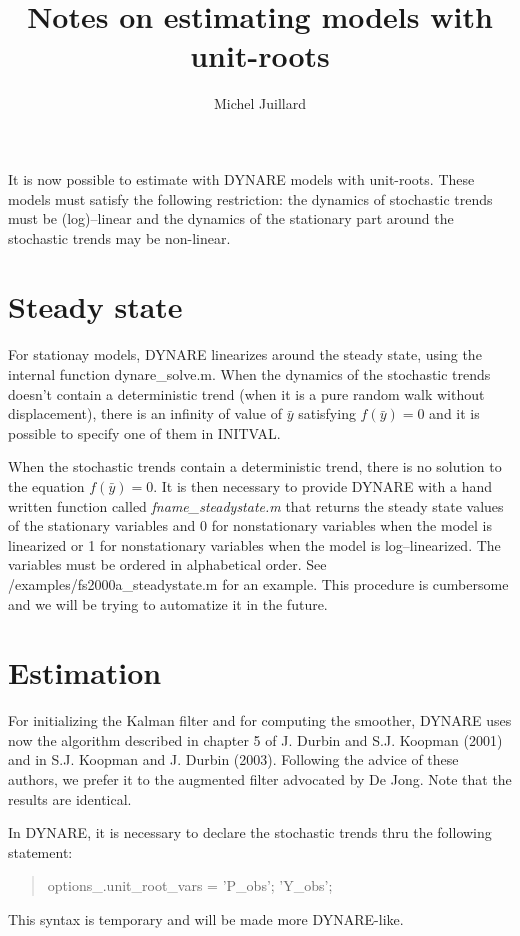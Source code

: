 \documentclass{article}
\begin{document}
\title{Notes on estimating models with unit-roots}
\author{Michel Juillard}
\maketitle

It is now possible to estimate with DYNARE models with unit-roots. These models must satisfy the following restriction: the dynamics of stochastic trends must be (log)--linear and the dynamics of the stationary part around the stochastic trends may be non-linear. 

\section{Steady state}

For stationay models, DYNARE linearizes around the steady state, using the internal function dynare\_solve.m. When the dynamics of the stochastic trends doesn't contain a deterministic trend (when it is a pure random walk without displacement), there is an infinity of value of $\bar y$ satisfying $f(\bar y)=0$ and it is possible to specify one of them in INITVAL.

When the stochastic trends contain a deterministic trend, there is no solution to the equation $f(\bar y)=0$. It is then necessary to provide DYNARE with a hand written function called \emph{fname\_steadystate.m} that returns the steady state values of the stationary variables and 0 for nonstationary variables when the model is linearized or 1 for nonstationary variables when the model is log--linearized. The variables must be ordered in alphabetical order. See /examples/fs2000a\_steadystate.m for an example. This procedure is cumbersome and we will be trying to automatize it in the future.

\section{Estimation}

For initializing the Kalman filter and for computing the smoother, DYNARE uses now the algorithm described in chapter 5 of J. Durbin and S.J. Koopman (2001) and in S.J. Koopman and J. Durbin (2003). Following the advice of these authors, we prefer it to the augmented filter advocated by De Jong. Note that the results are identical.

In DYNARE, it is necessary to declare the stochastic trends thru the following statement:
\begin{quote}
  options\_.unit\_root\_vars = {'P\_obs'; 'Y\_obs'};
\end{quote}
This syntax is temporary and will be made more DYNARE-like.
\end{document}
